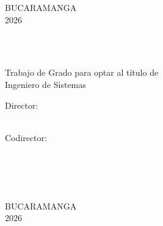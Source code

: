 
\thispagestyle{empty}

\begin{center}

\MakeUppercase{\titulo} \vspace{7.2cm}

\MakeUppercase{\autora}\\
\MakeUppercase{\autorb}\\
\vspace{7.2cm}

\MakeUppercase{\universidad}\\
\MakeUppercase{\facultad}\\
\MakeUppercase{\escuela}\\
BUCARAMANGA\\
2026\\

\end{center}


\newpage
\thispagestyle{empty}

\begin{center}

\MakeUppercase{\titulo} \vspace{1.2cm}

\MakeUppercase{\autora}\\
\MakeUppercase{\autorb}\\

\vspace{2.0cm}

Trabajo de Grado para optar al título de\\
Ingeniero de Sistemas\\\vspace{2.5cm}

Director:\\
\director\\
{\directortitulo}\vspace{0.5cm}

Codirector:\\
\codirectora\\
{\codirectoratitulo}\vspace{2.5cm}

\MakeUppercase{\universidad}\\
\MakeUppercase{\facultad}\\
\MakeUppercase{\escuela}\\
BUCARAMANGA\\
2026\\

\end{center}

